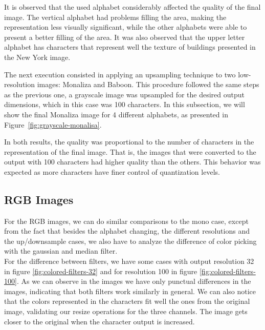 \documentclass[]{IEEEtran}
\begin{document}
It is observed that the used alphabet considerably affected the quality of the final image. The vertical alphabet had problems filling the area, making the representation less visually significant, while the other alphabets were able to present a better filling of the area. It was also observed that the upper letter alphabet has characters that represent well the texture of buildings presented in the New York image.

The next execution consisted in applying an upsampling technique to two low-resolution images: Monaliza and Baboon. This procedure followed the same steps as the previous one, a grayscale image was upsampled for the desired output dimensions, which in this case was 100 characters. In this subsection, we will show the final Monaliza image for 4 different alphabets, as presented in Figure~\ref{fig:grayscale-monalisa}.


In both results, the quality was proportional to the number of characters in the representation of the final image. That is, the images that were converted to the output with 100 characters had higher quality than the others. This behavior was expected as more characters have finer control of quantization levels.


\subsection{RGB Images}

For the RGB images, we can do similar comparisons to the mono case, except from the fact that besides the alphabet changing, the different resolutions and the up/downsample cases, we also have to analyze the difference of color picking with the gaussian and median filter. 
\\For the difference between filters, we have some cases with output resolution 32 in figure \ref{fig:colored-filters-32} and for resolution 100 in figure \ref{fig:colored-filters-100}. As we can observe in the images we have only punctual differences in the images, indicating that both filters work similarly in general. We can also notice that the colors represented in the characters fit well the ones from the original image, validating our resize operations for the three channels. The image gets closer to the original when the character output is increased.
\end{document}
